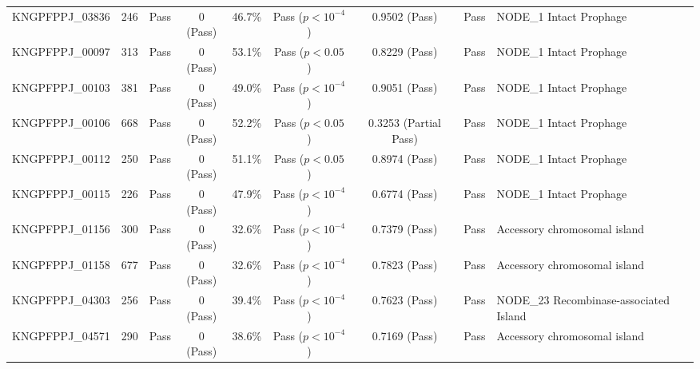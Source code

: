 \documentclass[review,11pt]{article}
\begin{document}
\begin{table}[p]
{\begin{tabular}{lcccccccp{7cm}}
KNGPFPPJ\_03836 & 246 & Pass & 0 (Pass) & 46.7\% & Pass ($p < 10^{-4}$) & 0.9502 (Pass) & Pass & NODE\_1 Intact Prophage \\
KNGPFPPJ\_00097 & 313 & Pass & 0 (Pass) & 53.1\% & Pass ($p < 0.05$) & 0.8229 (Pass) & Pass & NODE\_1 Intact Prophage \\
KNGPFPPJ\_00103 & 381 & Pass & 0 (Pass) & 49.0\% & Pass ($p < 10^{-4}$) & 0.9051 (Pass) & Pass & NODE\_1 Intact Prophage \\
KNGPFPPJ\_00106 & 668 & Pass & 0 (Pass) & 52.2\% & Pass ($p < 0.05$) & 0.3253 (Partial Pass) & Pass & NODE\_1 Intact Prophage \\
KNGPFPPJ\_00112 & 250 & Pass & 0 (Pass) & 51.1\% & Pass ($p < 0.05$) & 0.8974 (Pass) & Pass & NODE\_1 Intact Prophage \\
KNGPFPPJ\_00115 & 226 & Pass & 0 (Pass) & 47.9\% & Pass ($p < 10^{-4}$) & 0.6774 (Pass) & Pass & NODE\_1 Intact Prophage \\
KNGPFPPJ\_01156 & 300 & Pass & 0 (Pass) & 32.6\% & Pass ($p < 10^{-4}$) & 0.7379 (Pass) & Pass & Accessory chromosomal island \\
KNGPFPPJ\_01158 & 677 & Pass & 0 (Pass) & 32.6\% & Pass ($p < 10^{-4}$) & 0.7823 (Pass) & Pass & Accessory chromosomal island \\
KNGPFPPJ\_04303 & 256 & Pass & 0 (Pass) & 39.4\% & Pass ($p < 10^{-4}$) & 0.7623 (Pass) & Pass & NODE\_23 Recombinase-associated Island \\
KNGPFPPJ\_04571 & 290 & Pass & 0 (Pass) & 38.6\% & Pass ($p < 10^{-4}$) & 0.7169 (Pass) & Pass & Accessory chromosomal island \\
\bottomrule
\end{tabular}%
}
\end{table}

\begin{table}[H]
\centering
\caption{\textbf{MM-GBSA Binding Free Energy Decomposition and \textit{In Silico} Active-Site Alanine Scanning for GNAT\_KA27 Bound to Kanamycin.}}
\label{tab:alanine_scanning}
\end{table}
\end{document}
